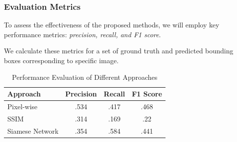 \documentclass[13.5pt,aspecratio=169, xcolor=dvipsnames]{beamer}
\begin{document}

\begin{frame}
    \onehalfspacing
        \frametitle{ Evaluation Metrics}
       
        \begin{block}{}
            To assess the effectiveness of the proposed methods, we will employ key performance metrics: \textit{precision, recall, and F1 score}. 
        \end{block}

        We calculate these metrics for a set of ground truth and predicted bounding boxes corresponding to specific
        image.

        \begin{table}[htbp]
            \centering
            \caption{Performance Evaluation of Different Approaches}
            \label{tab:performance}
            \begin{tabular}{lccc}
                \toprule
                \textbf{Approach} & \textbf{Precision} & \textbf{Recall} & \textbf{F1 Score} \\
                \midrule
                Pixel-wise & .534 & .417 & .468 \\
                SSIM & .314 & .169 & .22 \\
                Siamese Network & .354 & .584 & .441 \\
                \bottomrule
            \end{tabular}
        \end{table}
    \end{frame}

\end{document}
